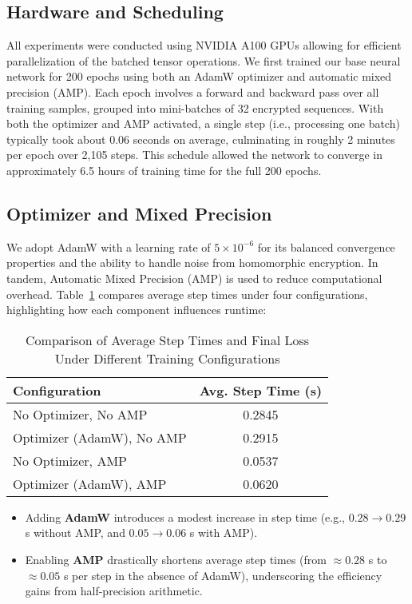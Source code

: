 \documentclass{article}
\begin{document}
\subsection{Hardware and Scheduling}

All experiments were conducted using NVIDIA A100 GPUs allowing for efficient parallelization of the batched tensor operations. We first trained our base neural network for 200 epochs using both an AdamW optimizer and automatic mixed precision (AMP). Each epoch involves a forward and backward pass over all training samples, grouped into mini-batches of 32 encrypted sequences. With both the optimizer and AMP activated, a single step (i.e., processing one batch) typically took about 0.06 seconds on average, culminating in roughly 2 minutes per epoch over 2,105 steps. This schedule allowed the network to converge in approximately 6.5 hours of training time for the full 200 epochs.

\subsection{Optimizer and Mixed Precision}

We adopt AdamW with a learning rate of $5 \times 10^{-6}$ for its balanced convergence properties and the ability to handle noise from homomorphic encryption. In tandem, Automatic Mixed Precision (AMP) is used to reduce computational overhead. Table~\ref{tab:training_times} compares average step times under four configurations, highlighting how each component influences runtime:

\begin{table}[h]
    \centering
    \label{tab:training_times}
    \begin{tabular}{|l|c|}
        \hline
        \textbf{Configuration} & \textbf{Avg. Step Time (s)} \\
        \hline
        No Optimizer, No AMP & 0.2845 \\
        Optimizer (AdamW), No AMP & 0.2915 \\
        No Optimizer, AMP & 0.0537 \\
        Optimizer (AdamW), AMP & 0.0620 \\
        \hline
    \end{tabular}
    \caption{Comparison of Average Step Times and Final Loss Under Different Training Configurations}
\end{table}

\begin{itemize}
    \item Adding \textbf{AdamW} introduces a modest increase in step time (e.g., $0.28 \rightarrow 0.29$ s without AMP, and $0.05 \rightarrow 0.06$ s with AMP).
    \item Enabling \textbf{AMP} drastically shortens average step times (from $\approx 0.28$ s to $\approx 0.05$ s per step in the absence of AdamW), underscoring the efficiency gains from half-precision arithmetic.
\end{itemize}
\end{document}
